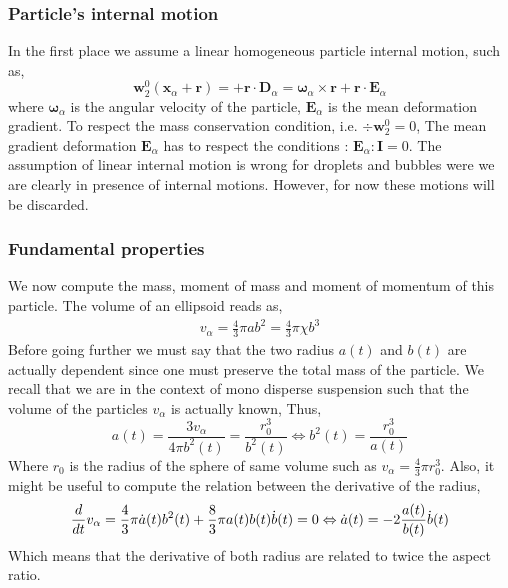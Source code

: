 \subsubsection{Particle's internal motion}

In the first place we assume a linear homogeneous particle internal motion, such as, 
\begin{equation}
    \textbf{w}_2^0(\textbf{x}_\alpha+ \textbf{r})
    = 
    + \textbf{r} \cdot \textbf{D}_\alpha
    = 
    \bm{\omega}_\alpha \times \textbf{r} 
    + \textbf{r} \cdot \textbf{E}_\alpha
\end{equation}
where $\bm{\omega}_\alpha$ is the angular velocity of the particle, $\textbf{E}_\alpha$ is the mean deformation gradient. 
To respect the mass conservation condition, i.e. $\div \textbf{w}_2^0 =0$, The mean gradient deformation $\textbf{E}_\alpha$ has to respect the conditions : $\textbf{E}_\alpha:\textbf{I}=0$. 
The assumption of linear internal motion is wrong for droplets and bubbles were we are clearly in presence of internal motions. 
However, for now these motions will be discarded. 

\subsubsection{Fundamental properties}

We now compute the mass, moment of mass and moment of momentum of this particle. 
The volume of an ellipsoid reads as, 
\begin{align}
    v_\alpha
    = \frac{4}{3}\pi a b^2
    = \frac{4}{3}\pi \chi  b^3
    \label{eq:volume_def}
\end{align}
Before going further we must say that the two radius $a(t)$ and $b(t)$ are actually dependent since one must preserve the total mass of the particle. 
We recall that we are in the context of mono disperse suspension such that the volume of the particles $v_\alpha$ is actually known, Thus, 
\begin{equation*}
    a(t) 
    = \frac{3 v_\alpha}{4 \pi b^2(t)}
    = \frac{r_0^3}{ b^2(t)}
    \Leftrightarrow
    b^2(t) 
    = \frac{r_0^3}{ a(t)}
\end{equation*}
Where $r_0$ is the radius of the sphere of same volume such as $v_\alpha = \frac{4}{3}\pi r_0^3$. 
Also, it might be useful to compute the relation between the derivative of the radius,  
\begin{equation*}
    \frac{d}{d t} v_\alpha 
    = \frac{4}{3}\pi \dot{a}(t) b^2(t)
    + \frac{8}{3} \pi {a}(t) b(t) \dot{b}(t)
    = 0 
    \Leftrightarrow
     \dot{a}(t)
    =  
    - 2 \frac{a(t)}{b(t)}  \dot{b}(t)
\end{equation*}
Which means that the derivative of both radius are related to twice the aspect ratio. 

